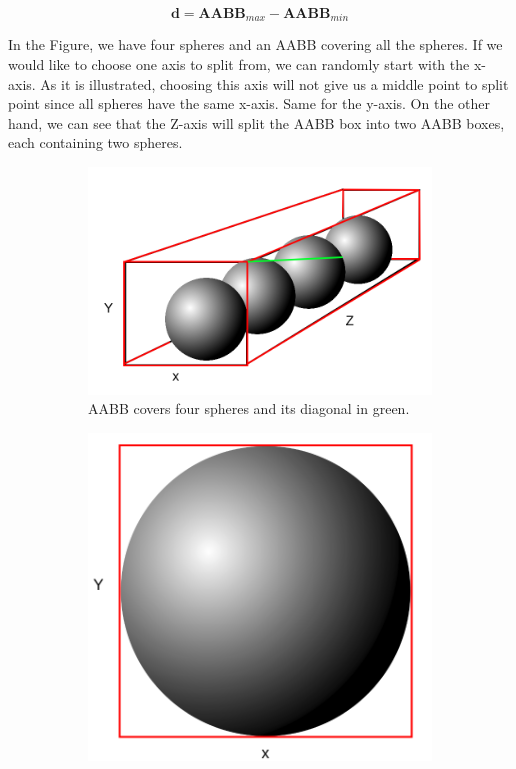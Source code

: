 \documentclass[11pt,a4paper]{article}
\begin{document}
\begin{equation}
\textbf{d} = \textbf{AABB}_{max} - \textbf{AABB}_{min}
\end{equation}

In the Figure, we have four spheres and an AABB covering all the spheres. If we would like to choose one axis to split from, we can randomly start with the x-axis. As it is illustrated, choosing this axis will not give us a middle point to split point since all spheres have the same x-axis. Same for the y-axis. On the other hand, we can see that the Z-axis will split the AABB box into two AABB boxes, each containing two spheres. 

\begin{figure}[H]	
     \centering
     \begin{subfigure}[b]{0.3\textwidth}
         \centering
         \includegraphics[width=\textwidth]{images/longaxis.png}
         \caption{AABB covers four spheres and its diagonal in green.}
         \label{fig:pi_4000}
     \end{subfigure}
     \hfill
     \begin{subfigure}[b]{0.3\textwidth}
         \centering
         \includegraphics[width=\textwidth]{images/LONGAXIS_Y.png}

\end{subfigure}
\end{figure}
\end{document}
